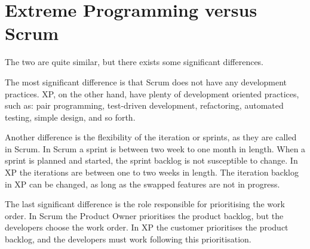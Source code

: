 \section{Extreme Programming versus Scrum}
The two are quite similar, but there exists some significant differences.

The most significant difference is that Scrum does not have any development practices.
XP, on the other hand, have plenty of development oriented practices, such as: pair programming, test-driven development, refactoring, automated testing, simple design, and so forth.

Another difference is the flexibility of the iteration or sprints, as they are called in Scrum.
In Scrum a sprint is between two week to one month in length.
When a sprint is planned and started, the sprint backlog is not susceptible to change.
In XP the iterations are between one to two weeks in length.
The iteration backlog in XP can be changed, as long as the swapped features are not in progress.

The last significant difference is the role responsible for prioritising the work order.
In Scrum the Product Owner prioritises the product backlog, but the developers choose the work order.
In XP the customer prioritises the product backlog, and the developers must work following this prioritisation. 